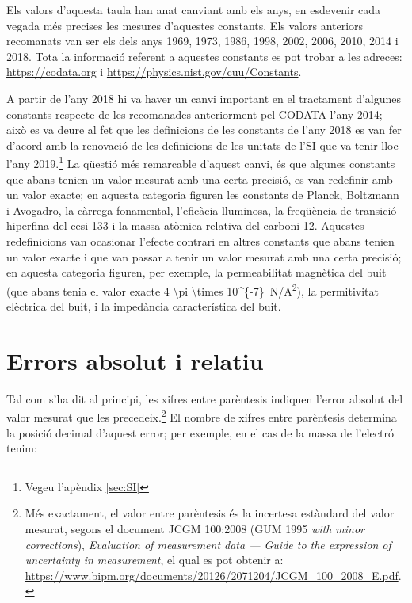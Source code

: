 Els valors d'aquesta taula  han anat canviant amb els anys, en esdevenir cada vegada més precises les mesures d'aquestes constants. Els valors anteriors recomanats van ser els dels anys 1969, 1973, 1986, 1998, 2002, 2006, 2010, 2014 i 2018.   Tota la informació referent a aquestes constants es pot trobar   a
les adreces: \href{https://codata.org//}{https:/\!\!/codata.org} i \href{https://physics.nist.gov/cuu/Constants/}{https:/\!\!/physics.nist.gov/cuu/Constants}.


A partir de l'any 2018 hi va haver un canvi important en el tractament d'algunes constants respecte de les recomanades anteriorment pel CODATA l'any 2014; això es va deure al fet que les definicions de les constants de l'any 2018 es van fer d'acord amb la renovació de les definicions de les unitats de l'SI que va tenir lloc l'any 2019.\footnote{Vegeu l'apèndix \ref{sec:SI}} La qüestió més remarcable d'aquest canvi, és que algunes constants que abans tenien un valor mesurat amb una certa precisió, es van redefinir amb un valor exacte; en aquesta categoria figuren les constants de Planck, Boltzmann i Avogadro, la càrrega fonamental, l'eficàcia lluminosa, la freqüència de transició hiperfina del cesi-133 i la massa atòmica relativa del carboni-12. Aquestes redefinicions van ocasionar l'efecte contrari en altres constants que abans tenien un valor exacte i que van passar a tenir un valor mesurat amb una certa precisió; en aquesta categoria figuren, per exemple, la permeabilitat  magnètica del buit (que abans tenia el valor exacte \qty[parse-numbers = false]{4 \pi \times 10^{-7}}{N/A^2}), la permitivitat elèctrica del buit, i la impedància característica del buit.


\section{Errors absolut i relatiu}\label{sec:err_abs_rel}

Tal com s'ha dit al principi, les xifres entre parèntesis indiquen l'error absolut del valor mesurat que les precedeix.\footnote{Més exactament, el valor entre parèntesis és la incertesa estàndard del valor mesurat, segons el document JCGM 100:2008 (GUM 1995 \textit{with minor
corrections}), \textit{Evaluation of measurement data --- Guide to the expression of uncertainty in
measurement}, el qual es pot obtenir a:  \href{https://www.bipm.org/documents/20126/2071204/JCGM_100_2008_E.pdf/}{https:/\!\!/www.bipm.org/documents/20126/2071204/JCGM\_100\_2008\_E.pdf}.} El nombre de xifres entre parèntesis determina la posició decimal d'aquest error; per exemple, en el cas de la  massa de l'electró tenim:

